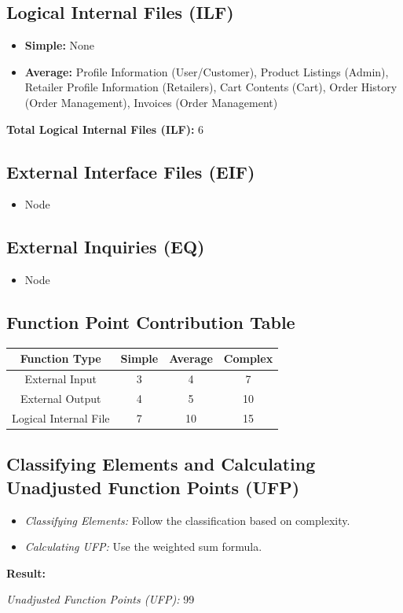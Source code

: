 \documentclass[a4paper,12pt]{article}
\begin{document}
\subsection{Logical Internal Files (ILF)}
\begin{itemize}
    \item \textbf{Simple:} None
    \item \textbf{Average:} Profile Information (User/Customer), Product Listings (Admin), Retailer Profile Information (Retailers), Cart Contents (Cart), Order History (Order Management), Invoices (Order Management)
\end{itemize}
\textbf{Total Logical Internal Files (ILF):} 6

\subsection{External Interface Files (EIF)}
\begin{itemize}
\item Node
\end{itemize}

\subsection{External Inquiries (EQ)}
\begin{itemize}
\item Node
\end{itemize}
\subsection{Function Point Contribution Table}
\begin{center}
\begin{tabular}{|c|c|c|c|}
\hline
Function Type & Simple & Average & Complex \\
\hline
External Input & 3 & 4 & 7 \\
External Output & 4 & 5 & 10 \\
Logical Internal File & 7 & 10 & 15 \\
\hline
\end{tabular}
\end{center}

\subsection{Classifying Elements and Calculating Unadjusted Function Points (UFP)}
\begin{itemize}
    \item \textit{Classifying Elements:} Follow the classification based on complexity.
    \item \textit{Calculating UFP:} Use the weighted sum formula.
\end{itemize}

\textbf{Result:}

\textit{Unadjusted Function Points (UFP):} 99
\end{document}
